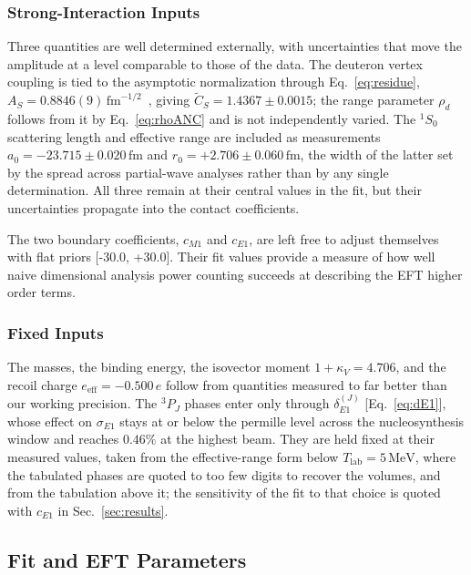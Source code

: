 \documentclass[
  aps,prd,twocolumn,nofootinbib,superscriptaddress,
  longbibliography,floatfix,preprintnumbers
]{revtex4-2}
\newcommand{\kappaV}{\kappa_{V}}
\newcommand{\Mone}{M1}
\newcommand{\Eone}{E1}
\newcommand{\AS}{A_{S}}
\newcommand{\CSv}{\tilde{C}_{S}}
\begin{document}
\subsubsection{Strong-Interaction Inputs}

Three quantities are well determined externally, with uncertainties that move
the amplitude at a level comparable to those of the data. The deuteron vertex coupling
is tied to the asymptotic normalization through Eq.~\eqref{eq:residue},
$\AS=0.8846(9)\,\mathrm{fm}^{-1/2}$~\cite{deSwart:1995ui}, giving
$\CSv=1.4367\pm0.0015$; the range parameter $\rho_{d}$ follows from it by
Eq.~\eqref{eq:rhoANC} and is not independently varied. The ${}^{1}S_{0}$
scattering length and effective range are included as measurements
$a_{0}=-23.715\pm0.020\,\mathrm{fm}$ and $r_{0}=+2.706\pm0.060\,\mathrm{fm}$,
the width of the latter set by the spread across partial-wave analyses rather
than by any single determination. All three remain at their central values in the
fit, but their uncertainties propagate into the contact coefficients.

The two boundary coefficients, $c_{\Mone}$ and $c_{\Eone}$, are left free to adjust themselves with flat
priors [-30.0, +30.0].  Their fit values provide a measure of how well naive dimensional analysis power counting succeeds
at describing the EFT higher order terms.

\subsubsection{Fixed Inputs}

The masses, the binding energy, the isovector moment $1+\kappaV=4.706$, and the
recoil charge $e_{\mathrm{eff}}=-0.500\,e$ follow from quantities measured to far
better than our working precision. The ${}^{3}P_{J}$ phases enter only through
$\delta_{\Eone}^{(J)}$ [Eq.~\eqref{eq:dE1}], whose effect on $\sigma_{\Eone}$ stays
at or below the permille level across the nucleosynthesis window and reaches
$0.46\%$ at the highest beam. They are held fixed at their measured values, taken from the
effective-range form below $T_{\mathrm{lab}}=5\,\mathrm{MeV}$, where the tabulated
phases are quoted to too few digits to recover the volumes, and from the tabulation
above it; the sensitivity of the fit to that choice is quoted with $c_{\Eone}$ in
Sec.~\ref{sec:results}.

\subsection{Fit and EFT Parameters}
\label{sec:params}
\end{document}
